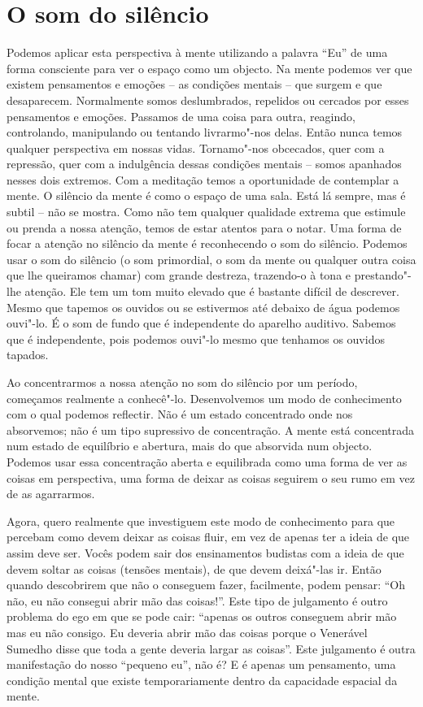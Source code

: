 \section{O som do silêncio}

Podemos aplicar esta perspectiva à mente utilizando a palavra ``Eu'' de
uma forma consciente para ver o espaço como um objecto. Na mente podemos
ver que existem pensamentos e emoções -- as condições mentais -- que
surgem e que desaparecem. Normalmente somos deslumbrados, repelidos ou
cercados por esses pensamentos e emoções. Passamos de uma coisa para
outra, reagindo, controlando, manipulando ou tentando livrarmo"-nos
delas. Então nunca temos qualquer perspectiva em nossas vidas.
Tornamo"-nos obcecados, quer com a repressão, quer com a indulgência
dessas condições mentais -- somos apanhados nesses dois extremos. Com a
meditação temos a oportunidade de contemplar a mente. O silêncio da
mente é como o espaço de uma sala. Está lá sempre, mas é subtil -- não
se mostra. Como não tem qualquer qualidade extrema que estimule ou
prenda a nossa atenção, temos de estar atentos para o notar. Uma forma
de focar a atenção no silêncio da mente é reconhecendo o som do
silêncio. Podemos usar o som do silêncio (o som primordial, o som da
mente ou qualquer outra coisa que lhe queiramos chamar) com grande
destreza, trazendo-o à tona e prestando"-lhe atenção. Ele tem um tom
muito elevado que é bastante difícil de descrever. Mesmo que tapemos os
ouvidos ou se estivermos até debaixo de água podemos ouvi"-lo. É o som de
fundo que é independente do aparelho auditivo. Sabemos que é
independente, pois podemos ouvi"-lo mesmo que tenhamos os ouvidos
tapados.

Ao concentrarmos a nossa atenção no som do silêncio por um período,
começamos realmente a conhecê"-lo. Desenvolvemos um modo de conhecimento
com o qual podemos reflectir. Não é um estado concentrado onde nos
absorvemos; não é um tipo supressivo de concentração. A mente está
concentrada num estado de equilíbrio e abertura, mais do que absorvida
num objecto. Podemos usar essa concentração aberta e equilibrada como
uma forma de ver as coisas em perspectiva, uma forma de deixar as coisas
seguirem o seu rumo em vez de as agarrarmos.

Agora, quero realmente que investiguem este modo de conhecimento para
que percebam como devem deixar as coisas fluir, em vez de apenas ter a
ideia de que assim deve ser. Vocês podem sair dos ensinamentos budistas
com a ideia de que devem soltar as coisas (tensões mentais), de que
devem deixá"-las ir. Então quando descobrirem que não o conseguem fazer,
facilmente, podem pensar: ``Oh não, eu não consegui abrir mão das
coisas!''. Este tipo de julgamento é outro problema do ego em que se
pode cair: ``apenas os outros conseguem abrir mão mas eu não consigo. Eu
deveria abrir mão das coisas porque o Venerável Sumedho disse que toda a
gente deveria largar as coisas''. Este julgamento é outra manifestação
do nosso ``pequeno eu'', não é? E é apenas um pensamento, uma condição
mental que existe temporariamente dentro da capacidade espacial da
mente.

